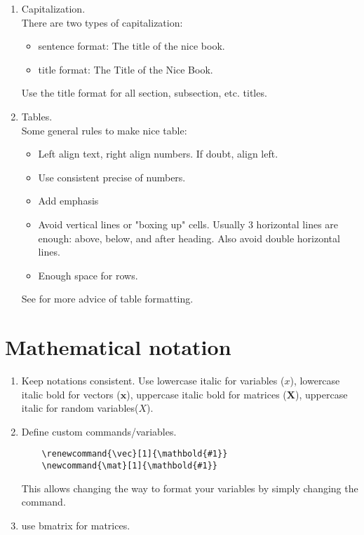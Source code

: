 \documentclass{article}
\begin{document}
\begin{enumerate}
   \item Capitalization.\\
   There are two types of capitalization:
   \begin{itemize}
       \item sentence format: The title of the nice book.
       \item title format: The Title of the Nice Book.
   \end{itemize}
   Use the title format for all section, subsection, etc. titles.
   
   \item Tables.\\
   Some general rules to make nice table:
   \begin{itemize}
       \item Left align text, right align numbers. If doubt, align left. 
       \item Use consistent precise of numbers. 
       \item Add emphasis 
       \item Avoid vertical lines or "boxing up" cells. Usually 3 horizontal lines are
enough: above, below, and after heading. Also avoid double horizontal lines.
        \item Enough space for rows.
   \end{itemize}
   See \cite{GuideTables} for more advice of table formatting. 
\end{enumerate}

\section{Mathematical notation}
\begin{enumerate}
    \item Keep notations consistent. Use lowercase italic for variables ($x$), lowercase italic bold for vectors ($\mathbold{x}$), uppercase italic bold for matrices ($\mathbold{X}$), uppercase italic for random variables($X$).
    \item Define custom commands/variables.
    \begin{lstlisting}
    \renewcommand{\vec}[1]{\mathbold{#1}}
    \newcommand{\mat}[1]{\mathbold{#1}}
    \end{lstlisting}
    This allows changing the way to format your variables by simply changing the command. 
        
    
    \item use bmatrix for matrices.
\end{enumerate}{}
\end{document}
